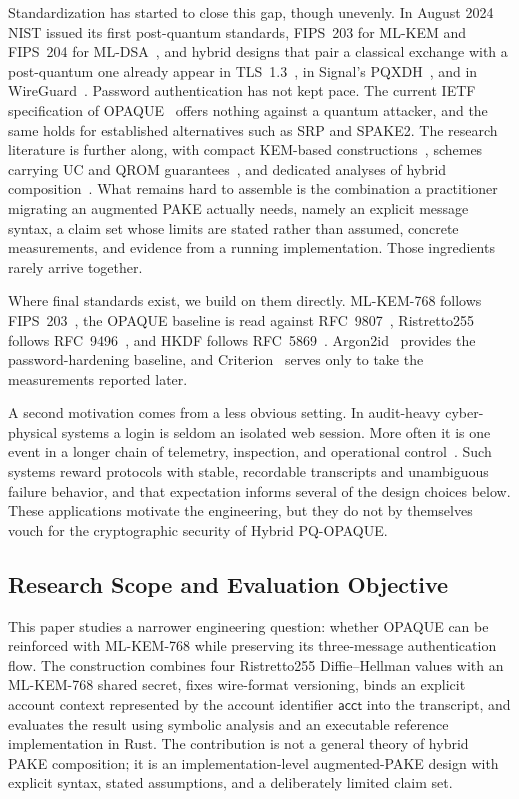 \documentclass[preprint,12pt]{elsarticle}
\newcommand{\acct}{\mathsf{acct}}
\theoremstyle{remark}
\begin{document}
Standardization has started to close this gap, though unevenly. In August 2024 NIST issued its first post-quantum standards, FIPS~203 for ML-KEM and FIPS~204 for ML-DSA~\cite{fips203,fips204}, and hybrid designs that pair a classical exchange with a post-quantum one already appear in TLS~1.3~\cite{stebila2024}, in Signal's PQXDH~\cite{brendel2020}, and in WireGuard~\cite{hulsing2021}. Password authentication has not kept pace. The current IETF specification of OPAQUE~\cite{ietf-opaque} offers nothing against a quantum attacker, and the same holds for established alternatives such as SRP and SPAKE2. The research literature is further along, with compact KEM-based constructions~\cite{arriaga2024}, schemes carrying UC and QROM guarantees~\cite{lyu2024uc}, and dedicated analyses of hybrid composition~\cite{hesse2024,lyu2024hybrid}. What remains hard to assemble is the combination a practitioner migrating an augmented PAKE actually needs, namely an explicit message syntax, a claim set whose limits are stated rather than assumed, concrete measurements, and evidence from a running implementation. Those ingredients rarely arrive together.

Where final standards exist, we build on them directly. ML-KEM-768 follows
FIPS~203~\cite{fips203}, the OPAQUE baseline is read against
RFC~9807~\cite{ietf-opaque}, Ristretto255 follows RFC~9496~\cite{devalence2024},
and HKDF follows RFC~5869~\cite{krawczyk2010}. Argon2id~\cite{biryukov2016}
provides the password-hardening baseline, and Criterion~\cite{heisler2023}
serves only to take the measurements reported later.

A second motivation comes from a less obvious setting. In audit-heavy
cyber-physical systems a login is seldom an isolated web session. More often
it is one event in a longer chain of telemetry, inspection, and operational
control~\cite{svystun2025dytam,svystun2024thermal,lysyi2025fire}. Such systems
reward protocols with stable, recordable transcripts and unambiguous failure
behavior, and that expectation informs several of the design choices below.
These applications motivate the engineering, but they do not by themselves
vouch for the cryptographic security of Hybrid PQ-OPAQUE.

\subsection{Research Scope and Evaluation Objective}

This paper studies a narrower engineering question: whether OPAQUE can be reinforced with ML-KEM-768 while preserving its three-message authentication flow. The construction combines four Ristretto255 Diffie--Hellman values with an ML-KEM-768 shared secret, fixes wire-format versioning, binds an explicit account context represented by the account identifier $\acct$ into the transcript, and evaluates the result using symbolic analysis and an executable reference implementation in Rust. The contribution is not a general theory of hybrid PAKE composition; it is an implementation-level augmented-PAKE design with explicit syntax, stated assumptions, and a deliberately limited claim set.
\end{document}
